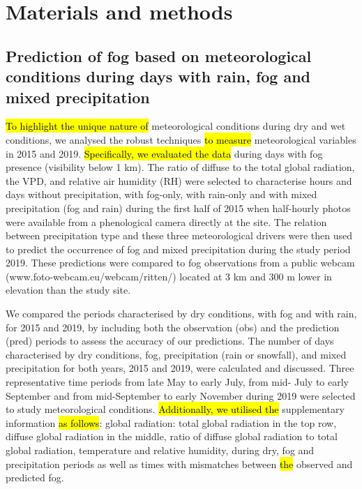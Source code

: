 \documentclass[10pt,letterpaper]{article}
\begin{document}
\section{Materials and methods}

\subsection{Prediction of fog based on meteorological conditions during days with rain, fog and mixed precipitation}

\hl{To highlight the unique nature of} meteorological conditions during dry and wet conditions, we analysed the robust techniques \hl{to measure }meteorological variables in 2015 and 2019. \hl{Specifically, we evaluated the data} during days with fog presence (visibility below 1 km). The ratio of diffuse to the total global radiation, the VPD, and relative air humidity (RH) were selected to characterise hours and days without precipitation, with fog-only, with rain-only and with mixed precipitation (fog and rain) during the first half of 2015 when half-hourly photos were available from a phenological camera directly at the site. The relation between precipitation type and these three meteorological drivers were then used to predict the occurrence of fog and mixed precipitation during the study period 2019. These predictions were compared to fog observations from a public webcam (www.foto-webcam.eu/webcam/ritten/) located at 3 km and 300 m lower in elevation than the study site. 

We compared the periods characterised by dry conditions, with fog and with rain, for 2015 and 2019, by including both the observation (obs) and the prediction (pred) periods to assess the accuracy of our predictions. The number of days characterised by dry conditions, fog, precipitation (rain or snowfall), and mixed precipitation for both years, 2015 and 2019, were calculated and discussed. Three representative time periods from late May to early July, from mid- July to early September and from mid-September to early November during 2019 were selected to study meteorological conditions. \hl{Additionally, we utilised the }supplementary information \hl{as follows}: global radiation: total global radiation in the top row, diffuse global radiation in the middle, ratio of diffuse global radiation to total global radiation, temperature and relative humidity,\hl{ }during dry, fog and precipitation periods as well as times with mismatches between \hl{the }observed and predicted fog.
\end{document}
